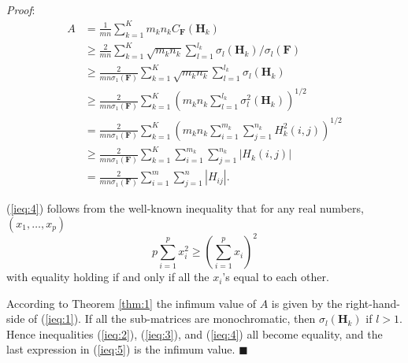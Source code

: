 \documentclass[12pt,onecolumn,draftcls]{IEEEtran}
\newcommand{\bH}{\mathbf{H}}
\begin{document}
\noindent
\textit{Proof}: \rm
\begin{align}
A& =  \frac{1}{mn} \sum_{k=1}^K m_k n_k \hat{C}_{\mathbf{F}}(\bH_k)\\
& \geq  \frac{2}{mn} \sum_{k=1}^K \sqrt{m_k n_k}
\sum_{l=1}^{l_k} \sigma_{l}(\mathbf{H}_k)/\sigma_{l}(\mathbf{F})   \label{ieq:1}\\
&\geq \frac{2}{mn\sigma_{1}(\mathbf{F})} \sum_{k=1}^K \sqrt{m_k n_k} \sum_{l=1}^{l_k} \sigma_{l}(\mathbf{H}_k)
\label{ieq:2}\\
& \geq \frac{2}{mn\sigma_{1}(\mathbf{F})} \sum_{k=1}^K \left( m_k n_k
\sum_{l=1}^{l_k} \sigma_{l}^2(\mathbf{H}_k) \right)^{1/2}\label{ieq:3}\\
&=\frac{2}{mn\sigma_{1}(\mathbf{F})} \sum_{k=1}^K \left( m_k n_k
 \sum_{i=1}^{m_k} \sum_{j=1}^{n_k} H_k^2 (i,j) \right)^{1/2}  \\
& \geq \frac{2}{mn\sigma_{1}(\mathbf{F})} \sum_{k=1}^K
\sum_{i=1}^{m_k} \sum_{j=1}^{n_k} |H_k (i,j)| \label{ieq:4}\\
& = \frac{2}{mn\sigma_{1}(\mathbf{F})} \sum_{i=1}^{m} \sum_{j=1}^{n} 
|H_{ij}| \label{ieq:5}.
\end{align}

(\ref{ieq:4}) follows from the well-known inequality that for any real numbers, $(x_1, \ldots, x_p)$
\begin{equation}
p\sum_{i=1}^p x_i^2 \geq \left( \sum_{i=1}^p x_i \right)^2
\label{ieq:6}
\end{equation}
with equality holding if and only if all the $x_i$'s equal to each other.

According to Theorem \ref{thm:1} the infimum value of $A$ is given by the right-hand-side of (\ref{ieq:1}).
If all the sub-matrices are monochromatic, then
$ \sigma_{l}(\mathbf{H}_k)$ if $l >1$.  Hence inequalities (\ref{ieq:2}), (\ref{ieq:3}), and (\ref{ieq:4}) all become equality, and
the last expression in (\ref{ieq:5}) is the infimum value.
\hfill $\blacksquare$
\end{document}
